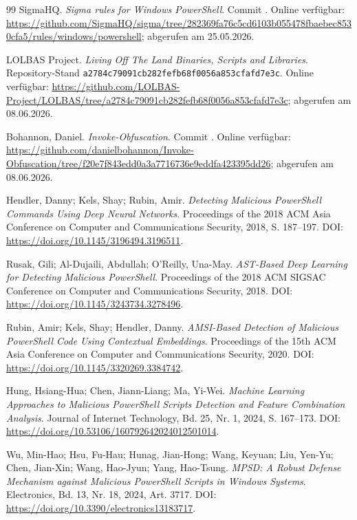 \documentclass[12pt,a4paper,oneside,parskip=half]{scrreprt}
\begin{document}
\begin{thebibliography}{99}
SigmaHQ. \emph{Sigma rules for Windows PowerShell}. Commit . Online verfügbar: \url{https://github.com/SigmaHQ/sigma/tree/282369fa76c5cd6103b055478fbaebec8530cfa5/rules/windows/powershell}; abgerufen am 25.05.2026.

LOLBAS Project. \emph{Living Off The Land Binaries, Scripts and Libraries}. Repository-Stand \texttt{a2784c79091cb282fefb68f0056a853cfafd7e3c}. Online verfügbar: \url{https://github.com/LOLBAS-Project/LOLBAS/tree/a2784c79091cb282fefb68f0056a853cfafd7e3c}; abgerufen am 08.06.2026.

Bohannon, Daniel. \emph{Invoke-Obfuscation}. Commit . Online verfügbar: \url{https://github.com/danielbohannon/Invoke-Obfuscation/tree/f20e7f843edd0a3a7716736e9eddfa423395dd26}; abgerufen am 08.06.2026.

Hendler, Danny; Kels, Shay; Rubin, Amir. \emph{Detecting Malicious PowerShell Commands Using Deep Neural Networks}. Proceedings of the 2018 ACM Asia Conference on Computer and Communications Security, 2018, S. 187--197. DOI: \url{https://doi.org/10.1145/3196494.3196511}.

Rusak, Gili; Al-Dujaili, Abdullah; O'Reilly, Una-May. \emph{AST-Based Deep Learning for Detecting Malicious PowerShell}. Proceedings of the 2018 ACM SIGSAC Conference on Computer and Communications Security, 2018. DOI: \url{https://doi.org/10.1145/3243734.3278496}.

Rubin, Amir; Kels, Shay; Hendler, Danny. \emph{AMSI-Based Detection of Malicious PowerShell Code Using Contextual Embeddings}. Proceedings of the 15th ACM Asia Conference on Computer and Communications Security, 2020. DOI: \url{https://doi.org/10.1145/3320269.3384742}.

Hung, Hsiang-Hua; Chen, Jiann-Liang; Ma, Yi-Wei. \emph{Machine Learning Approaches to Malicious PowerShell Scripts Detection and Feature Combination Analysis}. Journal of Internet Technology, Bd. 25, Nr. 1, 2024, S. 167--173. DOI: \url{https://doi.org/10.53106/160792642024012501014}.

Wu, Min-Hao; Hsu, Fu-Hau; Hunag, Jian-Hong; Wang, Keyuan; Liu, Yen-Yu; Chen, Jian-Xin; Wang, Hao-Jyun; Yang, Hao-Tsung. \emph{MPSD: A Robust Defense Mechanism against Malicious PowerShell Scripts in Windows Systems}. Electronics, Bd. 13, Nr. 18, 2024, Art. 3717. DOI: \url{https://doi.org/10.3390/electronics13183717}.


\end{thebibliography}
\end{document}

